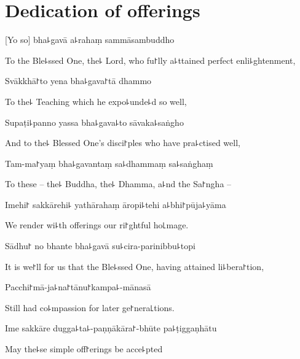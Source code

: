 
\chapter{Dedication of offerings}                   %

[Yo so] bha꜕gavā a꜕rahaṃ sammāsambuddho

\begin{english}
To the Ble꜕ssed One, the꜕ Lord, who fu꜓lly a꜕ttained perfect enli꜕ghtenment,
\end{english}

Svākkhā꜓to yena bha꜕gava꜓tā dhammo

\begin{english}
To the꜕ Teaching which he expo꜕unde꜕d so well,
\end{english}

Supaṭi꜕panno yassa bha꜕gava꜕to sāvaka꜕saṅgho

\begin{english}
And to the꜕ Blessed One's disci꜓ples who have pra꜕ctised well,
\end{english}

Tam-ma꜓yaṃ bha꜕gavantaṃ sa꜕dhammaṃ sa꜕saṅghaṃ

\begin{english}
To these -- the꜕ Buddha, the꜕ Dhamma, a꜕nd the Sa꜓ngha --
\end{english}

Imehi꜓ sakkārehi꜕ yathārahaṃ āropi꜕tehi a꜕bhi꜓pūja꜕yāma

\begin{english}
We render wi꜕th offerings our ri꜓ghtful ho꜖mage.
\end{english}

Sādhu꜓ no bhante bha꜕gavā su꜕cira-parinibbu꜕topi

\begin{english}
It is we꜓ll for us that the Ble꜕ssed One, having attained li꜕bera꜓tion,
\end{english}

Pacchi꜓mā-ja꜕na꜓tānu꜓kampa꜕-mānasā

\begin{english}
Still had co꜕mpassion for later ge꜓nera꜖tions.
\end{english}

Ime sakkāre dugga꜕ta꜕-paṇṇākāra꜓-bhūte pa꜕ṭiggaṇhātu

\begin{english}
May the꜕se simple off꜓erings be acce꜕pted
\end{english}

